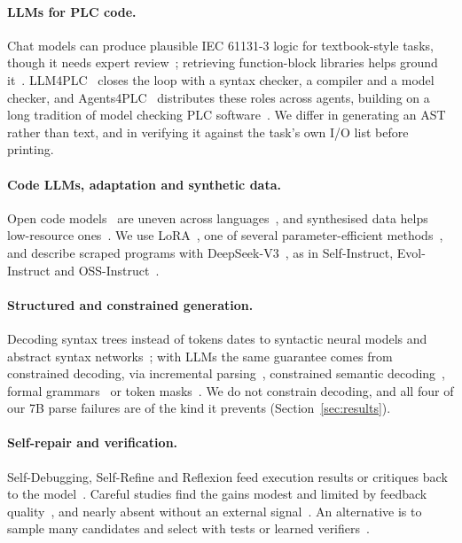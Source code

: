 \documentclass{ceurart}
\begin{document}
\paragraph{LLMs for PLC code.}
Chat models can produce plausible IEC 61131-3 logic for textbook-style tasks, though it needs expert review~\cite{koziolek2023etfa}; retrieving function-block libraries helps ground it~\cite{koziolek2024rag}. LLM4PLC~\cite{fakih2024llm4plc} closes the loop with a syntax checker, a compiler and a model checker, and Agents4PLC~\cite{liu2024agents4plc} distributes these roles across agents, building on a long tradition of model checking PLC software~\cite{darvas2015plcverif,ovatman2016overview}. We differ in generating an AST rather than text, and in verifying it against the task's own I/O list before printing.

\paragraph{Code LLMs, adaptation and synthetic data.}
Open code models~\cite{nijkamp2023codegen,li2023starcoder,roziere2023codellama,guo2024deepseekcoder,hui2024qwen25coder} are uneven across languages~\cite{cassano2023multiple}, and synthesised data helps low-resource ones~\cite{cassano2024multiplt}. We use LoRA~\cite{hu2022lora}, one of several parameter-efficient methods~\cite{houlsby2019adapters,dettmers2023qlora}, and describe scraped programs with DeepSeek-V3~\cite{deepseekv3}, as in Self-Instruct, Evol-Instruct and OSS-Instruct~\cite{wang2023selfinstruct,luo2024wizardcoder,wei2024magicoder}.
\paragraph{Structured and constrained generation.}
Decoding syntax trees instead of tokens dates to syntactic neural models and abstract syntax networks~\cite{yin2017syntactic,rabinovich2017asn}; with LLMs the same guarantee comes from constrained decoding, via incremental parsing~\cite{scholak2021picard}, constrained semantic decoding~\cite{poesia2022synchromesh}, formal grammars~\cite{geng2023gcd} or token masks~\cite{willard2023outlines}. We do not constrain decoding, and all four of our 7B parse failures are of the kind it prevents (Section~\ref{sec:results}).

\paragraph{Self-repair and verification.}
Self-Debugging, Self-Refine and Reflexion feed execution results or critiques back to the model~\cite{chen2024selfdebug,madaan2023selfrefine,shinn2023reflexion}. Careful studies find the gains modest and limited by feedback quality~\cite{olausson2024selfrepair}, and nearly absent without an external signal~\cite{huang2024cannot}. An alternative is to sample many candidates and select with tests or learned verifiers~\cite{li2022alphacode,chen2023codet,ni2023lever}.
\end{document}
